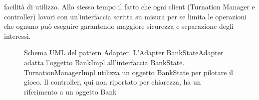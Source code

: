 facilità di utilizzo. 
Allo stesso tempo il fatto che ogni client (Turnation Manager e controller) lavori con un'interfaccia scritta su misura per se limita le operazioni che ognuno può eseguire garantendo maggiore sicurezza e separazione degli interessi.\newline
\begin{figure}[H]
    \centering
    \caption{Schema UML del pattern Adapter. L'Adapter BankStateAdapter adatta l'oggetto BankImpl all'interfaccia BankState. TurnationManagerImpl utilizza
    un oggetto BankState per pilotare il gioco. Il controller, qui non riportato per chiarezza, ha un riferimento a un oggetto Bank}
	\label{img:bankstate}
\end{figure}
